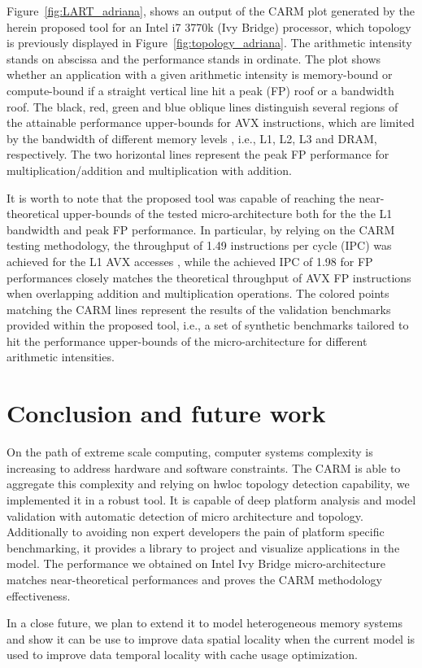 \documentclass[twoside,twocolumn,8pt]{extarticle}
\begin{document}
Figure~\ref{fig:LART_adriana}, shows an output of the CARM plot generated by the herein proposed tool for an Intel i7
3770k (Ivy Bridge) processor, which topology is previously displayed in Figure~\ref{fig:topology_adriana}.
The arithmetic intensity stands on abscissa and the performance stands in ordinate. The plot shows whether an application with a
given arithmetic intensity is memory-bound or compute-bound if a straight vertical line hit a peak (FP) roof or a bandwidth roof.
The black, red, green and blue oblique lines distinguish several regions of the attainable performance upper-bounds for AVX
instructions, which are limited by the bandwidth of different memory levels , i.e., L1, L2, L3 and DRAM, respectively.
The two horizontal lines represent the peak FP performance for multiplication/addition and multiplication with addition. 

It is worth to note that the proposed tool was capable of reaching the near-theoretical upper-bounds of the tested
micro-architecture both for the the L1 bandwidth and peak FP performance.  In particular, by relying on the CARM testing
methodology,  the throughput of 1.49 instructions per cycle (IPC) was achieved for the  L1 AVX accesses , while the achieved IPC of
1.98 for FP performances closely matches the theoretical throughput of AVX FP instructions when overlapping addition and
multiplication operations. 
The colored points matching the CARM lines represent the results of the validation benchmarks provided within the proposed tool,
i.e., a set of synthetic benchmarks tailored to hit the performance upper-bounds of the micro-architecture for different
arithmetic intensities.

\section{Conclusion and future work}\label{sec:conclusion}

On the path of extreme scale computing, computer systems complexity is increasing to address hardware and software constraints.
The CARM is able to aggregate this complexity and relying on hwloc topology detection capability, we implemented it in a robust
tool. It is capable of deep platform analysis and model validation with automatic detection of micro architecture and topology.
Additionally to avoiding non expert developers the pain of platform specific benchmarking, it provides a library to project and
visualize applications in the model. The performance we obtained on Intel Ivy Bridge micro-architecture matches near-theoretical
performances and proves the CARM methodology effectiveness.

In a close future, we plan to extend it to model heterogeneous memory systems and show it can be use to improve data spatial
locality when the current model is used to improve data temporal locality with cache usage optimization.



\end{document}
